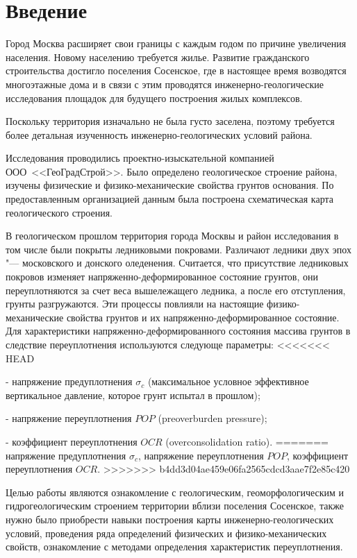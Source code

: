 \chapter*{Введение}                         %

Город Москва расширяет свои границы с каждым годом по причине увеличения населения. 
Новому населению требуется жилье. Развитие гражданского строительства достигло поселения 
Сосенское, где в настоящее время возводятся многоэтажные дома и в связи с этим проводятся 
инженерно-геологические исследования площадок для будущего построения жилых комплексов.

Поскольку территория изначально не была густо заселена, поэтому требуется более детальная 
изученность инженерно-геологических условий района.

Исследования проводились проектно-изыскательной компанией ООО~<<ГеоГрадСтрой>>. 
Было определено геологическое строение района, изучены физические и физико-механические свойства грунтов основания. 
По предоставленным организацией данным была построена схематическая карта геологического строения.

В геологическом прошлом территория города Москвы и район исследования в том числе были 
покрыты ледниковыми покровами. Различают ледники двух эпох "--- московского и донского оледенения. 
Считается, что присутствие ледниковых покровов изменяет напряженно-деформированное состояние 
грунтов, они переуплотняются за счет веса вышележащего ледника, а после его отступления, 
грунты разгружаются. Эти процессы повлияли на настоящие физико-механические свойства грунтов 
и их напряженно-деформированное состояние. Для характеристики напряженно-деформированного 
состояния массива грунтов в следствие переуплотнения используются следующе параметры:
<<<<<<< HEAD

- напряжение предуплотнения $\sigma_c$ (максимальное условное эффективное вертикальное давление, 
которое грунт испытал в прошлом);

- напряжение переуплотнения $POP$ (preoverburden pressure);

- коэффициент переуплотнения $OCR$ (overconsolidation ratio).
=======
напряжение предуплотнения $\sigma_c$, 
напряжение переуплотнения $POP$,
коэффициент переуплотнения $OCR$.
>>>>>>> b4dd3d04ae459e06fa2565cdcd3aae7f2e85c420

Целью работы являются ознакомление с геологическим, геоморфологическим и 
гидрогеологическим строением территории вблизи поселения Сосенское, также 
нужно было приобрести навыки построения карты инженерно-геологических 
условий, проведения ряда определений физических и физико-механических 
свойств, ознакомление с методами определения характеристик переуплотнения.

